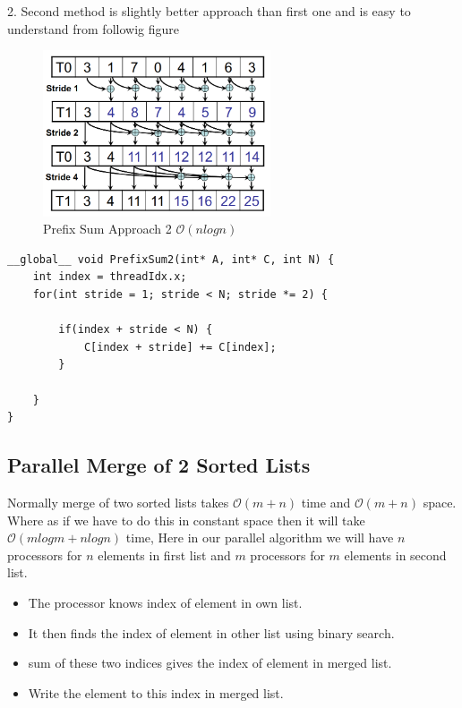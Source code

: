 \documentclass{article}
\begin{document}
\newpage

2. Second method is slightly better approach than first one and is easy to understand from followig figure

\begin{figure}[h]
    \centering
    \includegraphics[width=0.6\textwidth]{Images/prefix2method.png}
    \caption{Prefix Sum Approach 2 $\mathcal{O}(nlogn)$}
\end{figure}


\begin{lstlisting}
__global__ void PrefixSum2(int* A, int* C, int N) {
    int index = threadIdx.x;
    for(int stride = 1; stride < N; stride *= 2) {

        if(index + stride < N) {
            C[index + stride] += C[index];
        }

    }
}
\end{lstlisting}

\subsection*{Parallel Merge of 2 Sorted Lists}
Normally merge of two sorted lists takes $\mathcal{O}(m+n)$ time and $\mathcal{O}(m+n)$ space. Where as if we have to do this in constant space then it will take $\mathcal{O}(mlogm + nlogn)$ time, Here in our parallel algorithm we will have $n$ processors for $n$ elements in first list and $m$ processors for $m$ elements in second list.

\begin{itemize}
    \item The processor knows index of element in own list.
    \item It then finds the index of element in other list using binary search.
    \item sum of these two indices gives the index of element in merged list.
    \item Write the element to this index in merged list.
\end{itemize}
\end{document}

